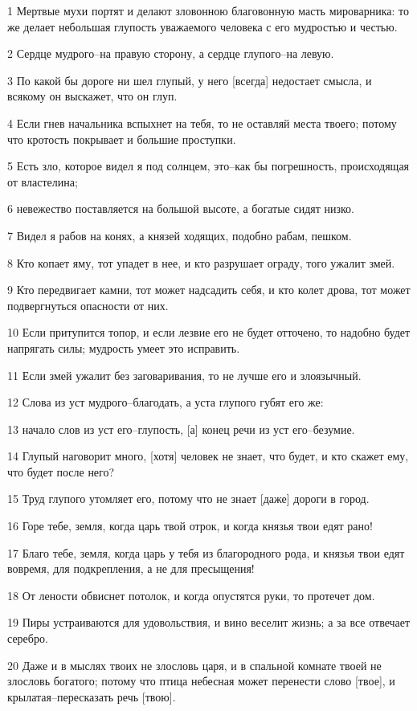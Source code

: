 \par 1 Мертвые мухи портят и делают зловонною благовонную масть мироварника: то же делает небольшая глупость уважаемого человека с его мудростью и честью.
\par 2 Сердце мудрого--на правую сторону, а сердце глупого--на левую.
\par 3 По какой бы дороге ни шел глупый, у него [всегда] недостает смысла, и всякому он выскажет, что он глуп.
\par 4 Если гнев начальника вспыхнет на тебя, то не оставляй места твоего; потому что кротость покрывает и большие проступки.
\par 5 Есть зло, которое видел я под солнцем, это--как бы погрешность, происходящая от властелина;
\par 6 невежество поставляется на большой высоте, а богатые сидят низко.
\par 7 Видел я рабов на конях, а князей ходящих, подобно рабам, пешком.
\par 8 Кто копает яму, тот упадет в нее, и кто разрушает ограду, того ужалит змей.
\par 9 Кто передвигает камни, тот может надсадить себя, и кто колет дрова, тот может подвергнуться опасности от них.
\par 10 Если притупится топор, и если лезвие его не будет отточено, то надобно будет напрягать силы; мудрость умеет это исправить.
\par 11 Если змей ужалит без заговаривания, то не лучше его и злоязычный.
\par 12 Слова из уст мудрого--благодать, а уста глупого губят его же:
\par 13 начало слов из уст его--глупость, [а] конец речи из уст его--безумие.
\par 14 Глупый наговорит много, [хотя] человек не знает, что будет, и кто скажет ему, что будет после него?
\par 15 Труд глупого утомляет его, потому что не знает [даже] дороги в город.
\par 16 Горе тебе, земля, когда царь твой отрок, и когда князья твои едят рано!
\par 17 Благо тебе, земля, когда царь у тебя из благородного рода, и князья твои едят вовремя, для подкрепления, а не для пресыщения!
\par 18 От лености обвиснет потолок, и когда опустятся руки, то протечет дом.
\par 19 Пиры устраиваются для удовольствия, и вино веселит жизнь; а за все отвечает серебро.
\par 20 Даже и в мыслях твоих не злословь царя, и в спальной комнате твоей не злословь богатого; потому что птица небесная может перенести слово [твое], и крылатая--пересказать речь [твою].

